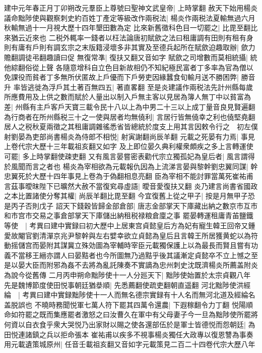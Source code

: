 建中元年春正月丁卯朔改元羣臣上尊號曰聖神文武皇帝|{
	上時掌翻}
赦天下始用楊炎議命黜陟使與觀察刺史約百姓丁產定等級改作兩税法|{
	楊炎作兩税法夏輸無過六月秋輸無過十一月視大歷十四年墾田數為定}
比來新舊徵科色目一切罷之|{
	比毘至翻比來猶云近來也}
二税外輒率一錢者以枉法論唐初賦歛之法曰租庸調有田則有租有身則有庸有戶則有調玄宗之末版籍浸壞多非其實及至德兵起所在賦歛迫趣取辦|{
	歛力贍翻調徒弔翻趣讀曰促}
無復常凖|{
	復扶又翻又音如字}
賦歛之司增數而莫相統攝|{
	統他綜翻俗從上聲}
各隨意增科自立色目新故相仍不知紀極民富者丁多率為官為僧以免課役而貧者丁多無所伏匿故上戶優而下戶勞吏因緣蠶食旬輸月送不勝困弊|{
	勝音升}
率皆逃徙為浮戶其土著百無四五|{
	著直畧翻}
至是炎建議作兩税法先計州縣每歲所應費用及上供之數而賦於人量出以制入戶無主客以見居為簿人無丁中以貧富為差|{
	州縣有主戶客戶天寶三載令民十八以上為中男二十三以上成丁量音良見賢遍翻}
為行商者在所州縣税三十之一使與居者均無僥利|{
	言居行皆無僥幸之利也僥堅堯翻}
居人之税秋夏兩徵之其租庸調雜徭悉省皆總統於度支上用其言因敕令行之　初左僕射劉晏為吏部尚書楊炎為侍郎不相悦|{
	射寅謝翻尚辰羊翻}
元載之死晏有力焉|{
	事見上卷代宗大歷十三年載祖亥翻又如字}
及上即位晏久典利權衆頗疾之多上言轉運使可罷|{
	多上時掌翻使疎吏翻}
又有風言晏嘗密表勸代宗立獨孤妃為皇后者|{
	風言謂得於風聞而言之者也}
楊炎為宰相欲為元載報仇因為上流涕言晏與黎幹劉忠翼同謀|{
	幹忠翼死於大歷十四年事見上卷為于偽翻相息亮翻}
臣為宰相不能討罪當萬死崔祐甫言茲事曖昩陛下已曠然大赦不當復䆒尋虛語|{
	曖音愛復扶又翻}
炎乃建言尚書省國政之本比置諸使分奪其權|{
	尚辰羊翻比毘至翻}
今宜復舊上從之甲子|{
	按是月無甲子恐是丙子否則戊子}
詔天下錢穀皆歸金部倉部|{
	唐志金部掌天下庫藏出納之數京市互市和市宫市交易之事倉部掌天下庫儲出納租税禄粮倉廩之事}
罷晏轉運租庸青苖鹽鐵等使　|{
	考異曰建中實録曰初大歷中上居東宫貞懿皇后方為妃有寵生韓王回帝又鍾愛故閹官劉清潬京兆尹黎幹與左右嬖幸欲立貞懿為皇后且言韓王所居獲黄蛇以為符動摇儲宫而晏附其謀冀立殊効圖為宰輔時宰臣元載獨保護上以為最長而賢且嘗有功義不當移王縉亦謂人曰晏黠者也今所圖無乃過黠乎後其議漸定貞懿卒不立上憾之至是以晏大臣而附邪為姦不去將為亂託陳奏不實謫為忠州刺史沈既濟楊炎所薦盖附炎為說今從舊傳}
二月丙申朔命黜陟使十一人分廵天下|{
	黜陟使始置於太宗貞觀八年}
先是魏博節度使田悦事朝廷猶㳟順|{
	先悉薦翻使疏吏翻朝直遥翻}
河北黜陟使洪經綸　|{
	考異曰建中實録黜陟使十一人而無名德宗實録有十人名而無河北道及經綸名盖脱誤也}
不曉時務聞悦軍七萬人符下罷其四萬令還農|{
	下遐稼翻令力丁翻}
悦陽順命如符罷之既而集應罷者激怒之曰汝曹久在軍中有父母妻子今一旦為黜陟使所罷將何資以自衣食乎衆大哭悦乃出家財以賜之使各還部伍於是軍士皆德悦而怨朝廷|{
	為田悦連諸鎮之兵以拒命張本}
崔祐甫以疾多不視事楊炎獨任大政專以復恩讐為事奏用元載遺策城原州|{
	任音壬載祖亥翻又音如字元載策見二百二十四卷代宗大歷八年}

